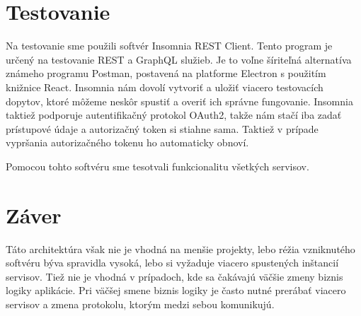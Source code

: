 \section{Testovanie} 

 Na testovanie sme použili softvér Insomnia REST Client\cite{insomnia}. Tento program je určený na testovanie REST a GraphQL služieb. Je to voľne šíriteľná alternatíva známeho programu Postman, postavená na platforme Electron s použitím knižnice React. Insomnia nám dovolí vytvoriť a uložiť viacero testovacích dopytov, ktoré môžeme neskôr spustiť a overiť ich správne fungovanie. Insomnia taktiež podporuje autentifikačný protokol OAuth2, takže nám stačí iba zadať prístupové údaje a autorizačný token si stiahne sama. Taktiež v prípade vypršania autorizačného tokenu ho automaticky obnoví. 
 
 Pomocou tohto softvéru sme tesotvali funkcionalitu všetkých servisov.

\section{Záver}

Táto architektúra však nie je vhodná na menšie projekty, lebo réžia vzniknutého softvéru býva spravidla vysoká, lebo si vyžaduje viacero spustených inštancií servisov. Tiež nie je vhodná v prípadoch, kde sa čakávajú väčšie zmeny biznis logiky aplikácie. Pri väčšej smene biznis logiky je často nutné prerábať viacero servisov a zmena protokolu, ktorým medzi sebou komunikujú.   
